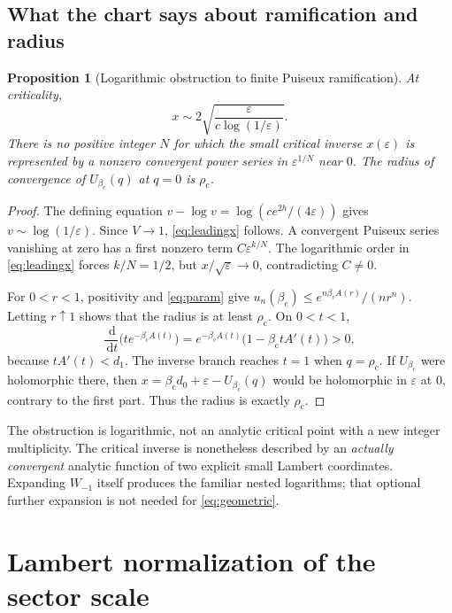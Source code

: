 \documentclass[11pt,a4paper]{article}
\numberwithin{equation}{section}
\newtheorem{proposition}[theorem]{Proposition}
\theoremstyle{definition}
\theoremstyle{remark}
\newcommand{\dd}{\,\mathrm d}
\newcommand{\bc}{\beta_{\mathrm c}}
\newcommand{\rhoc}{\rho_{\mathrm c}}
\newcommand{\eps}{\varepsilon}
\begin{document}
\subsection{What the chart says about ramification and radius}
\begin{proposition}[Logarithmic obstruction to finite Puiseux ramification]
\label{prop:ramification}
At criticality,
\begin{equation}\label{eq:leadingx}
 x\sim2\sqrt{\frac{\eps}{c\log(1/\eps)}}.
\end{equation}
There is no positive integer $N$ for which the small critical inverse
$x(\eps)$ is represented by a nonzero convergent power series in
$\eps^{1/N}$ near $0$. The radius of convergence of $U_{\bc}(q)$ at
$q=0$ is $\rhoc$.
\end{proposition}
\begin{proof}
The defining equation $v-\log v=\log(c e^{2h}/(4\eps))$ gives
$v\sim\log(1/\eps)$. Since $V\to1$, \eqref{eq:leadingx} follows.
A convergent Puiseux series vanishing at zero has a first nonzero term
$C\eps^{k/N}$. The logarithmic order in \eqref{eq:leadingx} forces
$k/N=1/2$, but $x/\sqrt\eps\to0$, contradicting $C\ne0$.

For $0<r<1$, positivity and \eqref{eq:param} give
$u_n(\bc)\le e^{n\bc A(r)}/(nr^n)$. Letting $r\uparrow1$ shows that
the radius is at least $\rhoc$. On $0<t<1$,
\[
 \frac{\dd}{\dd t}\bigl(t e^{-\bc A(t)}\bigr)
 =e^{-\bc A(t)}\bigl(1-\bc tA'(t)\bigr)>0,
\]
because $tA'(t)<d_1$. The inverse branch reaches $t=1$ when
$q=\rhoc$. If $U_{\bc}$ were holomorphic there, then
$x=\bc d_0+\eps-U_{\bc}(q)$ would be holomorphic in $\eps$ at $0$,
contrary to the first part. Thus the radius is exactly $\rhoc$.
\end{proof}

The obstruction is logarithmic, not an analytic critical point with a
new integer multiplicity. The critical inverse is nonetheless described
by an \emph{actually convergent} analytic function of two explicit small
Lambert coordinates. Expanding $W_{-1}$ itself produces the familiar
nested logarithms; that optional further expansion is not needed for
\eqref{eq:geometric}.

\section{Lambert normalization of the sector scale}
\label{sec:scale}
\end{document}
